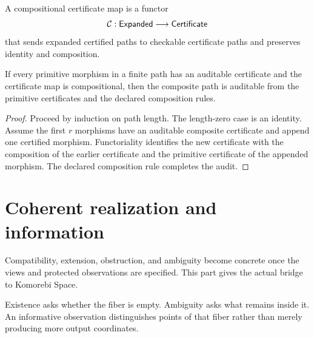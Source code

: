 \begin{PPTdefinition}
\label{PPT:res:6:3}
A compositional certificate map is a functor
\[
\mathcal C:\mathsf{Expanded}\longrightarrow\mathsf{Certificate}
\]
that sends expanded certified paths to checkable certificate paths and preserves identity and composition.
\end{PPTdefinition}

\begin{PPTproposition}
\label{PPT:res:6:4}
If every primitive morphism in a finite path has an auditable certificate and the certificate map is compositional, then the composite path is auditable from the primitive certificates and the declared composition rules.
\end{PPTproposition}

\begin{proof}
Proceed by induction on path length. The length-zero case is an identity. Assume the first $r$ morphisms have an auditable composite certificate and append one certified morphism. Functoriality identifies the new certificate with the composition of the earlier certificate and the primitive certificate of the appended morphism. The declared composition rule completes the audit.
\end{proof}



\chapter{Coherent realization and information}\label{PPT:book:chapter-51}
Compatibility, extension, obstruction, and ambiguity become concrete once the views and protected observations are specified. This part gives the actual bridge to Komorebi Space.

  \par
  Existence asks whether the fiber is empty. Ambiguity asks what remains inside it. An informative observation distinguishes points of that fiber rather than merely producing more output coordinates.
 



